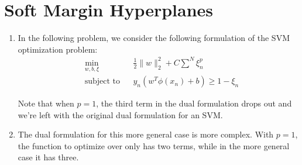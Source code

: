 \documentclass[12pt]{article}
\begin{document}
\section{Soft Margin Hyperplanes}
\begin{enumerate}[label=\alph*.]
	\item In the following problem, we consider the following formulation of the SVM optimization problem:
	\begin{equation*}
	\begin{aligned}
	& \underset{w, b, \xi}{\text{min}}
	& & \frac{1}{2} \lVert w \rVert^2_2 + C \sum^N{\xi_n^p} \\
	& \text{subject to}
	& & y_n(w^T \phi(x_n) + b) \geq 1 - \xi_n
	\end{aligned}
	\end{equation*}
	
	Note that when $p = 1$, the third term in the dual formulation drops out and we're left with the original dual formulation for an SVM.
	
	\item The dual formulation for this more general case is more complex. With $p = 1$, the function to optimize over only has two terms, while in the more general case it has three.
\end{enumerate}

%
%
\end{document}
